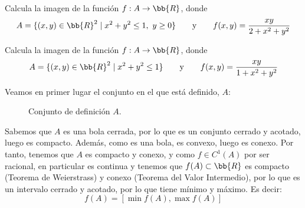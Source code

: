 \begin{ejercicio}
    Calcula la imagen de la función $f:A\to \bb{R}$, donde
    \begin{equation*}
        A = \{(x,y)\in \bb{R}^2\mid x^2+y^2\leq 1,~y\geq 0\}
        \qquad \text{y} \qquad
        f(x,y)=\frac{xy}{2+x^2+y^2}
    \end{equation*}
\end{ejercicio}



\begin{ejercicio}
    Calcula la imagen de la función $f:A\to \bb{R}$, donde
    \begin{equation*}
        A = \{(x,y)\in \bb{R}^2\mid x^2+y^2\leq 1\}
        \qquad \text{y} \qquad
        f(x,y)=\frac{xy}{1+x^2+y^2}
    \end{equation*}

    Veamos en primer lugar el conjunto en el que está definido, $A$:
    \begin{figure}[H]
        \centering
        \caption{Conjunto de definición $A$.}
    \end{figure}

    Sabemos que $A$ es una bola cerrada, por lo que es un conjunto
    cerrado y acotado, luego es compacto. Además, como es una bola,
    es convexo, luego es conexo. Por tanto, tenemos que $A$ es compacto y conexo, y como $f\in C^1(A)$ por ser racional,
    en particular es continua y tenemos que $f(A)\subset \bb{R}$ es compacto (Teorema de Weierstrass) y conexo (Teorema del Valor Intermedio), por lo que es un intervalo cerrado y acotado, por lo que tiene mínimo y máximo. Es decir:
    \begin{equation*}
        f(A) = [\min f(A), \max f(A)]
    \end{equation*}


\end{ejercicio}
